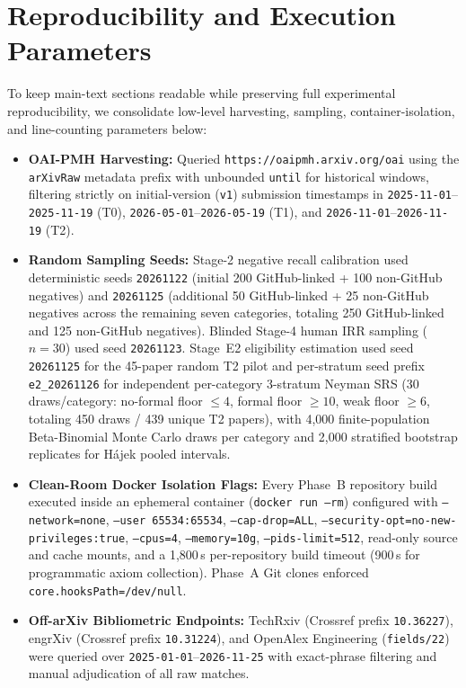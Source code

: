 \documentclass[11pt,letterpaper]{article}
\begin{document}
\section{Reproducibility and Execution Parameters}
\label{app:repro}

To keep main-text sections readable while preserving full experimental reproducibility, we consolidate low-level harvesting, sampling, container-isolation, and line-counting parameters below:
\begin{itemize}
  \item \textbf{OAI-PMH Harvesting:} Queried \texttt{https://oaipmh.arxiv.org/oai} using the \texttt{arXivRaw} metadata prefix with unbounded \texttt{until} for historical windows, filtering strictly on initial-version (\texttt{v1}) submission timestamps in \texttt{2025-11-01}--\texttt{2025-11-19} (T0), \texttt{2026-05-01}--\texttt{2026-05-19} (T1), and \texttt{2026-11-01}--\texttt{2026-11-19} (T2).
  \item \textbf{Random Sampling Seeds:} Stage-2 negative recall calibration used deterministic seeds \texttt{20261122} (initial 200 GitHub-linked + 100 non-GitHub negatives) and \texttt{20261125} (additional 50 GitHub-linked + 25 non-GitHub negatives across the remaining seven categories, totaling 250 GitHub-linked and 125 non-GitHub negatives). Blinded Stage-4 human IRR sampling ($n = 30$) used seed \texttt{20261123}. Stage~E2 eligibility estimation used seed \texttt{20261125} for the 45-paper random T2 pilot and per-stratum seed prefix \texttt{e2\_20261126} for independent per-category 3-stratum Neyman SRS (30 draws/category: no-formal floor $\le 4$, formal floor $\ge 10$, weak floor $\ge 6$, totaling 450 draws / 439 unique T2 papers), with 4,000 finite-population Beta-Binomial Monte Carlo draws per category and 2,000 stratified bootstrap replicates for H\'ajek pooled intervals.
  \item \textbf{Clean-Room Docker Isolation Flags:} Every Phase~B repository build executed inside an ephemeral container (\texttt{docker run --rm}) configured with \texttt{--network=none}, \texttt{--user 65534:65534}, \texttt{--cap-drop=ALL}, \texttt{--security-opt=no-new-privileges:true}, \texttt{--cpus=4}, \texttt{--memory=10g}, \texttt{--pids-limit=512}, read-only source and cache mounts, and a 1,800\,s per-repository build timeout (900\,s for programmatic axiom collection). Phase~A Git clones enforced \texttt{core.hooksPath=/dev/null}.
  \item \textbf{Off-arXiv Bibliometric Endpoints:} TechRxiv (Crossref prefix \texttt{10.36227}), engrXiv (Crossref prefix \texttt{10.31224}), and OpenAlex Engineering (\texttt{fields/22}) were queried over \texttt{2025-01-01}--\texttt{2026-11-25} with exact-phrase filtering and manual adjudication of all raw matches.

\end{itemize}
\end{document}
